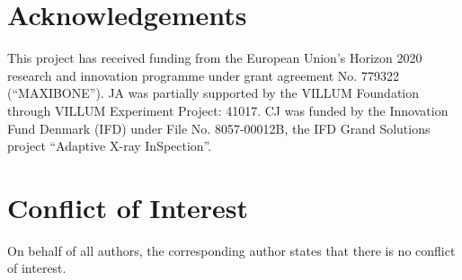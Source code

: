 \section{Acknowledgements}

This project has received funding from the European Union’s Horizon 2020 research and innovation programme under grant agreement No. 779322 (``MAXIBONE'').
JA was partially supported by the VILLUM Foundation through VILLUM Experiment Project: 41017.
CJ was funded by the Innovation Fund Denmark (IFD) under File No. 8057-00012B, the IFD Grand Solutions project ``Adaptive X-ray InSpection''.

\section{Conflict of Interest}
On behalf of all authors, the corresponding author states that there is no conflict of interest.


